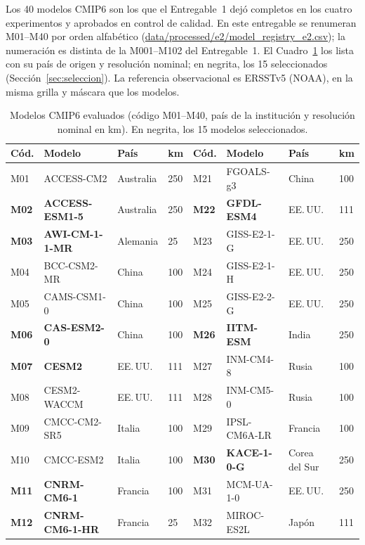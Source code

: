 \documentclass[11pt,a4paper]{article}
\newcommand{\archivo}[1]{\begingroup\hypersetup{urlcolor=black}\url{#1}\endgroup}
\begin{document}
Los 40 modelos CMIP6 son los que el Entregable~1 dejó completos en los cuatro experimentos y aprobados en control de calidad. En este entregable se renumeran M01--M40 por orden alfabético (\archivo{data/processed/e2/model_registry_e2.csv}); la numeración es distinta de la M001--M102 del Entregable~1. El Cuadro~\ref{tab:modelos} los lista con su país de origen y resolución nominal; en negrita, los 15 seleccionados (Sección~\ref{sec:seleccion}). La referencia observacional es ERSSTv5 (NOAA), en la misma grilla y máscara que los modelos.

\begin{table}[htbp]
\caption{Modelos CMIP6 evaluados (código M01--M40, país de la institución y resolución nominal en km). En negrita, los 15 modelos seleccionados.}
\label{tab:modelos}
\centering
\footnotesize
\setlength{\tabcolsep}{4pt}
\begin{tabular}{@{}llll@{\hspace{1.2em}}llll@{}}
\toprule
\textbf{Cód.} & \textbf{Modelo} & \textbf{País} & \textbf{km} & \textbf{Cód.} & \textbf{Modelo} & \textbf{País} & \textbf{km} \\
\midrule
M01 & ACCESS-CM2 & Australia & 250 & M21 & FGOALS-g3 & China & 100 \\
\textbf{M02} & \textbf{ACCESS-ESM1-5} & Australia & 250 & \textbf{M22} & \textbf{GFDL-ESM4} & EE.\,UU. & 111 \\
\textbf{M03} & \textbf{AWI-CM-1-1-MR} & Alemania & 25 & M23 & GISS-E2-1-G & EE.\,UU. & 250 \\
M04 & BCC-CSM2-MR & China & 100 & M24 & GISS-E2-1-H & EE.\,UU. & 250 \\
M05 & CAMS-CSM1-0 & China & 100 & M25 & GISS-E2-2-G & EE.\,UU. & 250 \\
\textbf{M06} & \textbf{CAS-ESM2-0} & China & 100 & \textbf{M26} & \textbf{IITM-ESM} & India & 250 \\
\textbf{M07} & \textbf{CESM2} & EE.\,UU. & 111 & M27 & INM-CM4-8 & Rusia & 100 \\
M08 & CESM2-WACCM & EE.\,UU. & 111 & M28 & INM-CM5-0 & Rusia & 100 \\
M09 & CMCC-CM2-SR5 & Italia & 100 & M29 & IPSL-CM6A-LR & Francia & 100 \\
M10 & CMCC-ESM2 & Italia & 100 & \textbf{M30} & \textbf{KACE-1-0-G} & Corea del Sur & 250 \\
\textbf{M11} & \textbf{CNRM-CM6-1} & Francia & 100 & M31 & MCM-UA-1-0 & EE.\,UU. & 250 \\
\textbf{M12} & \textbf{CNRM-CM6-1-HR} & Francia & 25 & M32 & MIROC-ES2L & Japón & 111 \\

\end{tabular}
\end{table}
\end{document}

